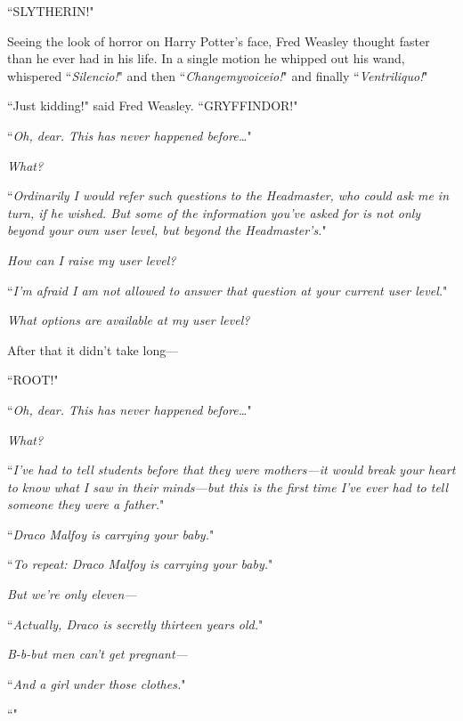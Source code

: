 ``SLYTHERIN!"

Seeing the look of horror on Harry Potter's face, Fred Weasley thought faster than he ever had in his life. In a single motion he whipped out his wand, whispered ``\emph{Silencio!}" and then ``\emph{Changemyvoiceio!}" and finally ``\emph{Ventriliquo!}"

``Just kidding!" said Fred Weasley. ``GRYFFINDOR!"

\later

``\emph{Oh, dear. This has never happened before{\ldots}}"

\emph{What?}

``\emph{Ordinarily I would refer such questions to the Headmaster, who could ask me in turn, if he wished. But some of the information you've asked for is not only beyond your own user level, but beyond the Headmaster's.}"

\emph{How can I raise my user level?}

``\emph{I'm afraid I am not allowed to answer that question at your current user level.}"

\emph{What options \emph{are} available at my user level?}

After that it didn't take long—

``ROOT!"

\later

``\emph{Oh, dear. This has never happened before{\ldots}}"

\emph{What?}

``\emph{I've had to tell students before that they were mothers—it would break your heart to know what I saw in their minds—but this is the first time I've ever had to tell someone they were a father.}"

\emph{}

``\emph{Draco Malfoy is carrying your baby.}"

\emph{}

``\emph{To repeat: Draco Malfoy is carrying your baby.}"

\emph{But we're only eleven—}

``\emph{Actually, Draco is secretly thirteen years old.}"

\emph{B-b-but men can't get pregnant—}

``\emph{And a girl under those clothes.}"

\emph{}

``\emph{}"

